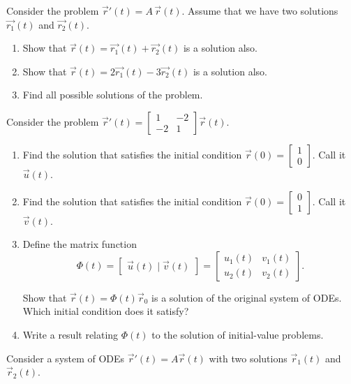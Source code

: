 \begin{exercises}
\begin{problist}
	
	\prob \label{prob:sys-superposition}Consider the problem \quad $\vec{r}'(t) = A \, \vec{r}(t)$.
	Assume that we have two solutions $\vec{r_1}(t)$ and $\vec{r_2}(t)$.
	\begin{enumerate}
		\item Show that $\vec{r}(t) = \vec{r_1}(t) + \vec{r_2}(t)$ is a solution also.
		\item Show that $\vec{r}(t) = 2\vec{r_1}(t) - 3\vec{r_2}(t)$ is a solution also.
		\item Find all possible solutions of the problem.
	\end{enumerate}
	
	
		\prob Consider the problem $\vec{r}'(t) = \begin{bmatrix} 1 & -2 \\ -2 & 1 \end{bmatrix} \vec{r}(t)$.
		\begin{enumerate}
			\item Find the solution that satisfies the initial condition $\vec{r}(0)=\begin{bmatrix}1 \\ 0\end{bmatrix}$. Call it $\vec{u}(t)$.
			\item Find the solution that satisfies the initial condition $\vec{r}(0)=\begin{bmatrix}0 \\ 1\end{bmatrix}$. Call it $\vec{v}(t)$.
			\item Define the matrix function
			$$ \Phi(t) = \begin{bmatrix} \vec{u}(t) \; | \; \vec{v}(t) \end{bmatrix} = \begin{bmatrix} u_1(t) & v_1(t) \\ u_2(t) & v_2(t) \end{bmatrix}.$$
			
			Show that $\vec{r}(t) = \Phi(t) \vec{r}_0$ is a solution of the original system of ODEs. Which initial condition does it satisfy?
			
			\item Write a result relating $\Phi(t)$ to the solution of initial-value problems.
			\end{enumerate}

	
	
		\prob \label{mod17:prob-W1}Consider a system of ODEs $\vec{r}'(t) = A \vec{r}(t)$ with two solutions $\vec{r}_1(t)$ and $\vec{r}_2(t)$. 
		

\end{problist}
\end{exercises}
